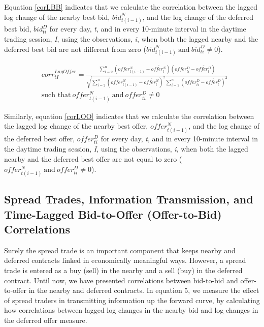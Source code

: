 \documentclass[]{elsarticle} %
\begin{document}
Equation \ref{corLBB} indicates that we calculate the correlation
between the lagged log change of the nearby best bid,
\(bid_{t(i-1)}^N\), and the log change of the deferred best bid,
\(bid_{ti}^D\) for every day, \emph{t}, and in every 10-minute interval
in the daytime trading session, \emph{I}, using the observations,
\emph{i}, when both the lagged nearby and the deferred best bid are not
different from zero
(\({bid_{t(i-1)}^N \: \textrm{and} \: bid_{ti}^D} \neq 0\)).

\begin{equation} \label{corLOO}
\begin{split}
& corr^{LagOffer}_{tI}  = \frac{\sum\limits_{i=2}^{n} \left(offer_{t(i-1)}^N - \overline{offer_t^N}\right) \left(offer_{ti}^D - \overline{offer_t^D}\right)}{\sqrt{\sum\limits_{i=2}^{n} \left(offer_{t(i-1)}^N - \overline{offer_t^N}\right)^2 \sum\limits_{i=2}^{n}\left(offer_{ti}^D - \overline{offer_t^D}\right)^2}} \\
& \textrm{such that} \: {offer_{t(i-1)}^N \: \textrm{and} \: offer_{ti}^D} \neq 0
\end{split}
\end{equation}

Similarly, equation \ref{corLOO} indicates that we calculate the
correlation between the lagged log change of the nearby best offer,
\(offer_{t(i-1)}^N\), and the log change of the deferred best offer,
\(offer_{ti}^D\) for every day, \emph{t}, and in every 10-minute
interval in the daytime trading session, \emph{I}, using the
observations, \emph{i}, when both the lagged nearby and the deferred
best offer are not equal to zero
(\({offer_{t(i-1)}^N \: \textrm{and} \: offer_{ti}^D} \neq 0\)).

\subsection{Spread Trades, Information Transmission, and Time-Lagged
Bid-to-Offer (Offer-to-Bid)
Correlations}\label{spread-trades-information-transmission-and-time-lagged-bid-to-offer-offer-to-bid-correlations}

Surely the spread trade is an important component that keeps nearby and
deferred contracts linked in economically meaningful ways. However, a
spread trade is entered as a buy (sell) in the nearby and a sell (buy)
in the deferred contract. Until now, we have presented correlations
between bid-to-bid and offer-to-offer in the nearby and deferred
contracts. In equation 5, we measure the effect of spread traders in
transmitting information up the forward curve, by calculating how
correlations between lagged log changes in the nearby bid and log
changes in the deferred offer measure.
\end{document}
